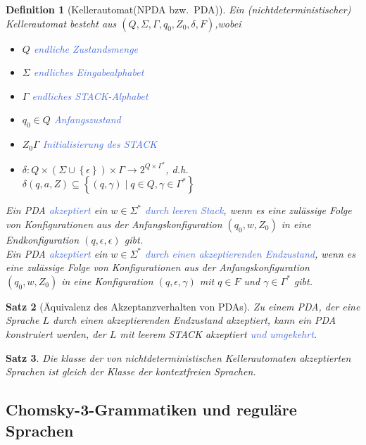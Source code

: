 \documentclass[11pt]{scrartcl}
\newcommand{\tcol}[1]{\textcolor{RoyalBlue}{#1}}
\newcommand{\set}[1]{\left\lbrace #1\right\rbrace}
\theoremstyle{break}
\newtheorem{satz}{Satz}[section]
\newtheorem{defi}[satz]{Definition}
\begin{document}
    \begin{defi}[Kellerautomat(NPDA bzw.\ PDA)]
        Ein (nichtdeterministischer) Kellerautomat besteht aus $(Q,\Sigma,\Gamma,q_0,Z_0,\delta,F)$,wobei
        \begin{itemize}
            \item $Q$ \tcol{endliche Zustandsmenge}
            \item $\Sigma$ \tcol{endliches Eingabealphabet}
            \item $\Gamma$ \tcol{endliches STACK-Alphabet}
            \item $q_0\in Q$ \tcol{Anfangszustand}
            \item $Z_0\Gamma$ \tcol{Initialisierung des STACK}
            \item $\delta\colon Q\times(\Sigma\cup\set{\epsilon})\times\Gamma\to 2^{Q\times\Gamma^*}$, d.h. $\delta(q,a,Z)\subseteq\set{(q,\gamma)\mid q\in Q,\gamma\in\Gamma^*}$
        \end{itemize}
        Ein PDA \tcol{akzeptiert} ein $w\in\Sigma^*$ \tcol{durch leeren Stack}, wenn es eine zulässige Folge von Konfigurationen aus der Anfangskonfiguration $(q_0,w,Z_0)$ in eine Endkonfiguration $(q,\epsilon,\epsilon)$ gibt.\\
        Ein PDA \tcol{akzeptiert} ein $w\in\Sigma^*$ \tcol{durch einen akzeptierenden Endzustand}, wenn es eine zulässige Folge von Konfigurationen aus der Anfangskonfiguration $(q_0,w,Z_0)$ in eine Konfiguration $(q,\epsilon,\gamma)$ mit $q\in F$ und $\gamma\in\Gamma^*$ gibt.
    \end{defi}

    \begin{satz}[Äquivalenz des Akzeptanzverhalten von PDAs]
        Zu einem PDA, der eine Sprache $L$ durch einen akzeptierenden Endzustand akzeptiert, kann ein PDA konstruiert werden, der $L$ mit leerem STACK akzeptiert \tcol{und umgekehrt}.
    \end{satz}

    \begin{satz}
        Die klasse der von nichtdeterministischen Kellerautomaten akzeptierten Sprachen ist gleich der Klasse der kontextfreien Sprachen.
    \end{satz}


    \subsection{Chomsky-3-Grammatiken und reguläre Sprachen}
	\label{subsec:chomsky-3-grammatiken-und-reguläre-sprachenindex}
\end{document}
